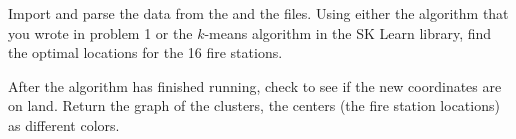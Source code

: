 \begin{problem}
	Import and parse the data from the  and the  files.
	Using either the algorithm that you wrote in problem 1 or the $k$-means algorithm in the SK Learn library, find the optimal locations for the 16 fire stations.
	
	After the algorithm has finished running, check to see if the new coordinates are on land.
	Return the graph of the clusters, the centers (the fire station locations) as different colors.
\end{problem}
